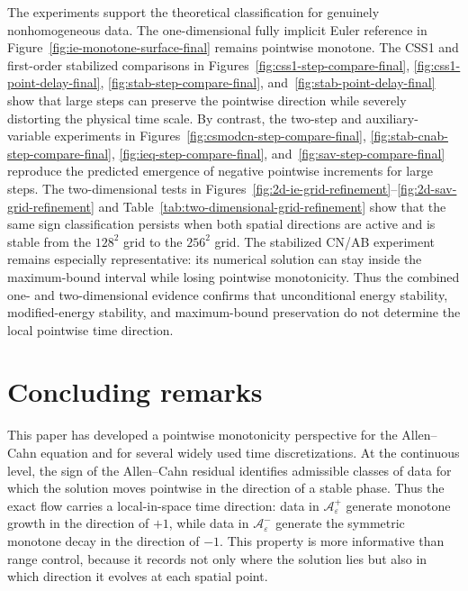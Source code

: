 \documentclass[final, 3p, times]{elsarticle}%
\begin{document}
The experiments support the theoretical classification for genuinely nonhomogeneous data. The one-dimensional fully implicit Euler reference in Figure~\ref{fig:ie-monotone-surface-final} remains pointwise monotone. The CSS1 and first-order stabilized comparisons in Figures~\ref{fig:css1-step-compare-final}, \ref{fig:css1-point-delay-final}, \ref{fig:stab-step-compare-final}, and~\ref{fig:stab-point-delay-final} show that large steps can preserve the pointwise direction while severely distorting the physical time scale. By contrast, the two-step and auxiliary-variable experiments in Figures~\ref{fig:csmodcn-step-compare-final}, \ref{fig:stab-cnab-step-compare-final}, \ref{fig:ieq-step-compare-final}, and~\ref{fig:sav-step-compare-final} reproduce the predicted emergence of negative pointwise increments for large steps. The two-dimensional tests in Figures~\ref{fig:2d-ie-grid-refinement}--\ref{fig:2d-sav-grid-refinement} and Table~\ref{tab:two-dimensional-grid-refinement} show that the same sign classification persists when both spatial directions are active and is stable from the $128^2$ grid to the $256^2$ grid. The stabilized CN/AB experiment remains especially representative: its numerical solution can stay inside the maximum-bound interval while losing pointwise monotonicity. Thus the combined one- and two-dimensional evidence confirms that unconditional energy stability, modified-energy stability, and maximum-bound preservation do not determine the local pointwise time direction.


\section{Concluding remarks}
\label{sec:con}

This paper has developed a pointwise monotonicity perspective for the Allen--Cahn equation and for several widely used time discretizations. At the continuous level, the sign of the Allen--Cahn residual identifies admissible classes of data for which the solution moves pointwise in the direction of a stable phase. Thus the exact flow carries a local-in-space time direction: data in \(\mathcal A_\varepsilon^+\) generate monotone growth in the direction of \(+1\), while data in \(\mathcal A_\varepsilon^-\) generate the symmetric monotone decay in the direction of \(-1\). This property is more informative than range control, because it records not only where the solution lies but also in which direction it evolves at each spatial point.
\end{document}

